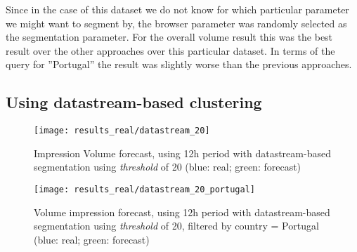 Since in the case of this dataset we do not know for which particular parameter
we might want to segment by, the browser parameter was randomly selected as the
segmentation parameter. For the overall volume result this was the best result
over the other approaches over this particular dataset. In terms of the query
for ''Portugal'' the result was slightly worse than the previous approaches.

\subsection*{Using datastream-based clustering}

\begin{figure}[!ht]
\centering
\begin{minipage}[t]{0.45\linewidth}
\texttt{[image: results\_real/datastream\_20]} \caption[Volume
impression forecast, real data, clustering datastream]{Impression Volume 
forecast, using 12h period with datastream-based segmentation using
\emph{threshold} of 20 (blue: real; green: forecast)}
\label{fig:vol_real_data_datastream}
\end{minipage}
\quad
\begin{minipage}[t]{0.45\linewidth}
\texttt{[image: results\_real/datastream\_20\_portugal]} \caption[Volume
impression forecast, real data, clustering datastream, filtered]{Volume impression
forecast, using 12h period with datastream-based segmentation using
\emph{threshold} of 20, filtered by country = Portugal  (blue: real; green: forecast)}
\label{fig:vol_real_data_datastream_filtered}
\end{minipage}

\end{figure}

